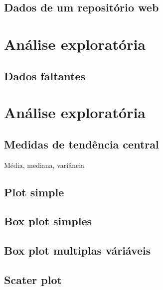 \documentclass[
]{book}
\begin{document}
\hypertarget{dados-de-um-reposituxf3rio-web}{%
\subsection{Dados de um repositório web}\label{dados-de-um-reposituxf3rio-web}}

\hypertarget{anuxe1lise-exploratuxf3ria}{%
\section{Análise exploratória}\label{anuxe1lise-exploratuxf3ria}}

\hypertarget{dados-faltantes}{%
\subsection{Dados faltantes}\label{dados-faltantes}}

\hypertarget{anuxe1lise-exploratuxf3ria-1}{%
\section{Análise exploratória}\label{anuxe1lise-exploratuxf3ria-1}}

\hypertarget{medidas-de-tenduxeancia-central}{%
\subsection{Medidas de tendência central}\label{medidas-de-tenduxeancia-central}}

Média, mediana, variância

\hypertarget{plot-simple}{%
\subsection{Plot simple}\label{plot-simple}}

\hypertarget{box-plot-simples}{%
\subsection{Box plot simples}\label{box-plot-simples}}

\hypertarget{box-plot-multiplas-vuxe1riuxe1veis}{%
\subsection{Box plot multiplas váriáveis}\label{box-plot-multiplas-vuxe1riuxe1veis}}

\hypertarget{scater-plot}{%
\subsection{Scater plot}\label{scater-plot}}
\end{document}
